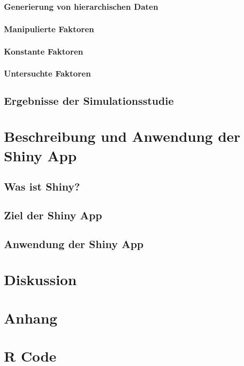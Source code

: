 \documentclass[12pt]{article}\usepackage[]{graphicx}\usepackage[]{color}
\begin{document}
\subsubsection{Generierung von hierarchischen Daten} \label{section:generierung_daten}
\subsubsection{Manipulierte Faktoren}
\subsubsection{Konstante Faktoren}
\subsubsection{Untersuchte Faktoren}
\subsection{Ergebnisse der Simulationsstudie}

\section{Beschreibung und Anwendung der Shiny App}
\subsection{Was ist Shiny?}
\subsection{Ziel der Shiny App}
\subsection{Anwendung der Shiny App}

\section{Diskussion}
\newpage



\section{Anhang}
\appendix
\section{R Code}
\end{document}
